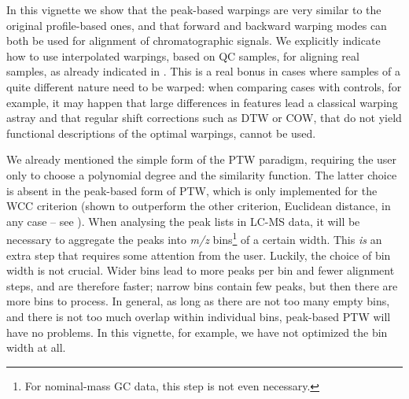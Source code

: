 \documentclass[a4paper,11pt]{article}\usepackage[]{graphicx}\usepackage[]{color}
\begin{document}
In this vignette we show that the peak-based warpings are very similar
to the original profile-based ones, and that forward and backward
warping modes can both be used for alignment of chromatographic
signals. We explicitly indicate how to use interpolated warpings,
based on QC samples, for aligning real samples, as already indicated
in \citet{Eilers2004}. This is a real bonus in cases where samples of
a quite different nature need to be warped: when comparing cases with
controls, for example, it may happen that large differences in
features lead a classical warping astray and that regular shift
corrections such as DTW or COW, that do not yield functional
descriptions of the optimal warpings, cannot be used.

We already mentioned the simple form of the PTW paradigm, requiring
the user only to choose a polynomial degree and the similarity
function. The latter choice is absent in the peak-based form of PTW,
which is only implemented for the WCC criterion (shown to outperform
the other criterion, Euclidean distance, in any case -- see
\citet{Bloemberg2010}). When analysing the peak lists in LC-MS data,
it will be necessary to aggregate the peaks into \emph{m/z}
bins\footnote{For nominal-mass GC data, this step is not even
  necessary.} of a certain width. This \emph{is} an extra step that
requires some attention from the user. Luckily, the choice of bin
width is not crucial. Wider bins lead to more peaks per bin and fewer
alignment steps, and are therefore faster; narrow bins contain few
peaks, but then there are more bins to process. In general, as long as
there are not too many empty bins, and there is not too much overlap
within individual bins, peak-based PTW will have no problems. In this
vignette, for example, we have not optimized the bin width at all.

\clearpage


 

\clearpage
\end{document}
